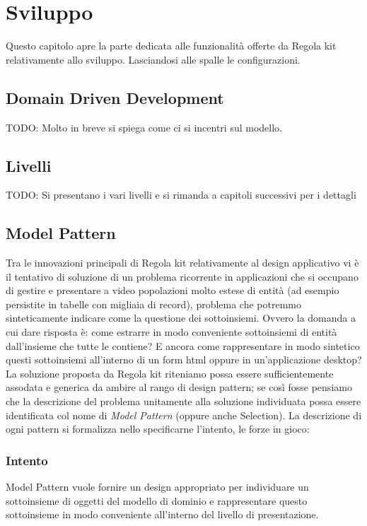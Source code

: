 \chapter{Sviluppo}
Questo capitolo apre la parte dedicata alle funzionalità offerte da Regola kit relativamente allo sviluppo. Lasciandosi alle spalle le configurazioni.

\section{Domain Driven Development}
TODO: Molto in breve si spiega come ci si incentri sul modello.

\section{Livelli}
TODO: Si presentano i vari livelli e si rimanda a capitoli successivi per i dettagli

\section{Model Pattern}
Tra le innovazioni principali di Regola kit relativamente al design applicativo vi è il tentativo di soluzione di un problema ricorrente in applicazioni che si occupano di gestire e presentare a video popolazioni molto estese di entità (ad esempio persistite in tabelle con migliaia di record), problema che potremmo sinteticamente indicare come la questione dei sottoinsiemi. Ovvero la domanda a cui dare risposta è: come estrarre in modo conveniente sottoinsiemi di entità dall'insieme che tutte le contiene? E ancora come rappresentare in modo sintetico questi sottoinsiemi all'interno di un form html oppure in un'applicazione desktop? La soluzione proposta da Regola kit  riteniamo possa essere sufficientemente assodata e generica da ambire al rango di design pattern; se così fosse pensiamo che la descrizione del problema unitamente alla soluzione individuata possa essere identificata col nome di \emph{Model Pattern}  (oppure anche Selection). 
La descrizione di ogni pattern si formalizza nello specificarne l'intento, le forze in gioco: 

\subsection{Intento}
Model Pattern vuole fornire un design appropriato per individuare un sottoinsieme di oggetti del modello di dominio e rappresentare questo sottoinsieme in modo conveniente all'interno del livello di presentazione.

